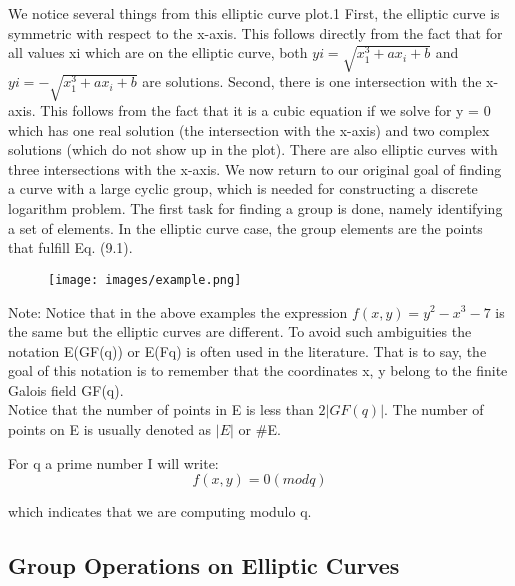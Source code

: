 \documentclass{article}
\begin{document}
We notice several things from this elliptic curve plot.1 First, the elliptic curve
is symmetric with respect to the x-axis. This follows directly from the fact that for
all values xi which are on the elliptic curve, both ${yi = \sqrt {x_1^3 + a x_i + b}}$ and ${yi =  - \sqrt{x_1^3 + a x_i + b}}$ are solutions. Second, there is one intersection with the x-axis.
This follows from the fact that it is a cubic equation if we solve for y = 0 which has
one real solution (the intersection with the x-axis) and two complex solutions (which
do not show up in the plot). There are also elliptic curves with three intersections
with the x-axis.
We now return to our original goal of finding a curve with a large cyclic group,
which is needed for constructing a discrete logarithm problem. The first task for
finding a group is done, namely identifying a set of elements. In the elliptic curve
case, the group elements are the points that fulfill Eq. (9.1).

\begin{figure}[h]
	\begin{center}
  		\texttt{[image: images/example.png]}
 	\end{center}
\end{figure}

\addvspace{1cm}

Note: Notice that in the above examples the expression ${f(x, y) = y^2 - x^3 - 7}$ is the same but the
elliptic curves are different. To avoid such ambiguities the notation E(GF(q)) or E(Fq) is
often used in the literature. That is to say, the goal of this notation is to remember that
the coordinates x, y belong to the finite Galois field GF(q).\\
 
Notice that the number of points in E is less than ${2 |GF(q)|}$. The number of points on E is
usually denoted as ${|E|}$ or \#E.
 
 For q a prime number I will write: 
 $${f(x,y) = 0 (mod q)}$$

 which indicates that we are computing modulo q.


\subsection{Group Operations on Elliptic Curves}
\end{document}
